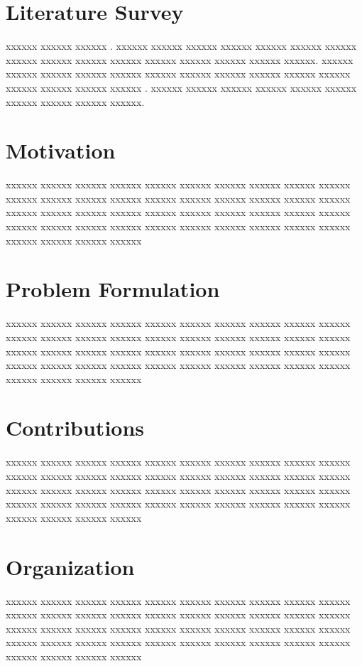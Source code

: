 \section{Literature Survey}
\label{LiteratureSurvey}

xxxxxx xxxxxx xxxxxx \cite{	SimonBook2006}. xxxxxx xxxxxx xxxxxx xxxxxx xxxxxx xxxxxx xxxxxx xxxxxx xxxxxx xxxxxx xxxxxx xxxxxx xxxxxx xxxxxx xxxxxx xxxxxx\cite{	Biglieri2006, ProakisBookDC}. xxxxxx xxxxxx xxxxxx xxxxxx xxxxxx xxxxxx xxxxxx xxxxxx xxxxxx xxxxxx xxxxxx xxxxxx xxxxxx xxxxxx xxxxxx \cite{	PapoulisBook2002}. xxxxxx xxxxxx xxxxxx xxxxxx xxxxxx xxxxxx xxxxxx xxxxxx xxxxxx xxxxxx.


\newpage
\section{Motivation}

xxxxxx xxxxxx xxxxxx xxxxxx xxxxxx xxxxxx xxxxxx xxxxxx xxxxxx xxxxxx xxxxxx xxxxxx xxxxxx xxxxxx xxxxxx xxxxxx xxxxxx xxxxxx xxxxxx xxxxxx xxxxxx xxxxxx xxxxxx xxxxxx xxxxxx xxxxxx xxxxxx xxxxxx xxxxxx xxxxxx xxxxxx xxxxxx xxxxxx xxxxxx xxxxxx xxxxxx xxxxxx xxxxxx xxxxxx xxxxxx xxxxxx xxxxxx xxxxxx xxxxxx 

\newpage
\section{Problem Formulation}

xxxxxx xxxxxx xxxxxx xxxxxx xxxxxx xxxxxx xxxxxx xxxxxx xxxxxx xxxxxx xxxxxx xxxxxx xxxxxx xxxxxx xxxxxx xxxxxx xxxxxx xxxxxx xxxxxx xxxxxx xxxxxx xxxxxx xxxxxx xxxxxx xxxxxx xxxxxx xxxxxx xxxxxx xxxxxx xxxxxx xxxxxx xxxxxx xxxxxx xxxxxx xxxxxx xxxxxx xxxxxx xxxxxx xxxxxx xxxxxx xxxxxx xxxxxx xxxxxx xxxxxx 

\newpage
\section{Contributions}

xxxxxx xxxxxx xxxxxx xxxxxx xxxxxx xxxxxx xxxxxx xxxxxx xxxxxx xxxxxx xxxxxx xxxxxx xxxxxx xxxxxx xxxxxx xxxxxx xxxxxx xxxxxx xxxxxx xxxxxx xxxxxx xxxxxx xxxxxx xxxxxx xxxxxx xxxxxx xxxxxx xxxxxx xxxxxx xxxxxx xxxxxx xxxxxx xxxxxx xxxxxx xxxxxx xxxxxx xxxxxx xxxxxx xxxxxx xxxxxx xxxxxx xxxxxx xxxxxx xxxxxx 


\section{Organization}

xxxxxx xxxxxx xxxxxx xxxxxx xxxxxx xxxxxx xxxxxx xxxxxx xxxxxx xxxxxx xxxxxx xxxxxx xxxxxx xxxxxx xxxxxx xxxxxx xxxxxx xxxxxx xxxxxx xxxxxx xxxxxx xxxxxx xxxxxx xxxxxx xxxxxx xxxxxx xxxxxx xxxxxx xxxxxx xxxxxx xxxxxx xxxxxx xxxxxx xxxxxx xxxxxx xxxxxx xxxxxx xxxxxx xxxxxx xxxxxx xxxxxx xxxxxx xxxxxx xxxxxx 

